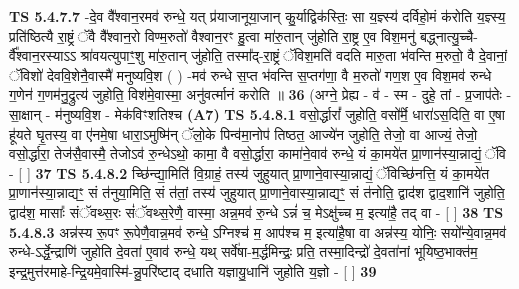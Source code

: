 \documentclass[17pt]{extarticle}
\begin{document}
                  \newline
                                \textbf{ TS 5.4.7.7} \newline
                  -दे॒व वै᳚श्वान॒रमव॑ रुन्धे॒ यत् प्र॑याजानूया॒जान् कु॒र्याद्विक॑स्तिः॒ सा य॒ज्ञ्स्य॑ दर्विहो॒मं क॑रोति य॒ज्ञ्स्य॒ प्रति॑ष्ठित्यै रा॒ष्ट्रं ॅवै वै᳚श्वान॒रो विण्म॒रुतो॑ वैश्वान॒रꣳ हु॒त्वा मा॑रु॒तान् जु॑होति रा॒ष्ट्र ए॒व विश॒मनु॑ बद्ध्नात्यु॒च्चै-र्वै᳚श्वान॒रस्याऽऽ श्रा॑वयत्युपाꣳ॒॒शु मा॑रु॒तान् जु॑होति॒ तस्मा᳚द्-रा॒ष्ट्रं ॅविश॒मति॑ वदति मारु॒ता भ॑वन्ति म॒रुतो॒ वै दे॒वानां॒ ॅविशो॑ देववि॒शेनै॒वास्मै॑ मनुष्यवि॒श ( ) -मव॑ रुन्धे स॒प्त भ॑वन्ति स॒प्तग॑णा॒ वै म॒रुतो॑ गण॒श ए॒व विश॒मव॑ रुन्धे ग॒णेन॑ ग॒णम॑नु॒द्रुत्य॑ जुहोति॒ विश॑मे॒वास्मा॒ अनु॑वर्त्मानं करोति ॥ \textbf{  36 } \newline
                  \newline
                      (अग्ने॒ प्रेह्य - व॑ - स्म - दुहे॒ तां - प्र॒जाप॑तेः - सा॒क्षान् - म॑नुष्यवि॒श - मेक॑विꣳशतिश्च  \textbf{(A7)} \newline \newline
                                        \textbf{ TS 5.4.8.1} \newline
                  वसो॒र्द्धारां᳚ जुहोति॒ वसो᳚र्मे॒ धारा॑ऽस॒दिति॒ वा ए॒षा हू॑यते घृ॒तस्य॒ वा ए॑नमे॒षा धारा॒ऽमुष्मि॑न् ॅलो॒के पिन्व॑मा॒नोप॑ तिष्ठत॒ आज्ये॑न जुहोति॒ तेजो॒ वा आज्यं॒ तेजो॒ वसो॒र्द्धारा॒ तेज॑सै॒वास्मै॒ तेजोऽव॑ रु॒न्धेऽथो॒ कामा॒ वै वसो॒र्द्धारा॒ कामा॑ने॒वाव॑ रुन्धे॒ यं का॒मये॑त प्रा॒णान॑स्या॒न्नाद्यं॒ ॅवि - [  ] \textbf{  37} \newline
                  \newline
                                \textbf{ TS 5.4.8.2} \newline
                  च्छि॑न्द्या॒मिति॑ वि॒ग्राहं॒ तस्य॑ जुहुयात् प्रा॒णाने॒वास्या॒न्नाद्यं॒ ॅविच्छि॑नत्ति॒ यं का॒मये॑त प्रा॒णान॑स्या॒न्नाद्यꣳ॒॒ सं त॑नुया॒मिति॒ सं त॑तां॒ तस्य॑ जुहुयात् प्रा॒णाने॒वास्या॒न्नाद्यꣳ॒॒ सं त॑नोति॒ द्वाद॑श द्वाद॒शानि॑ जुहोति॒ द्वाद॑श॒ मासाः᳚ संॅवथ्स॒रः सं॑ॅवथ्स॒रेणै॒ वास्मा॒ अन्न॒मव॑ रु॒न्धे ऽन्नं॑ च॒ मेऽक्षु॑च्च म॒ इत्या॑है॒ तद् वा - [  ] \textbf{  38} \newline
                  \newline
                                \textbf{ TS 5.4.8.3} \newline
                  अन्न॑स्य रू॒पꣳ रू॒पेणै॒वान्न॒मव॑ रुन्धे॒ ऽग्निश्च॑ म॒ आप॑श्च म॒ इत्या॑है॒षा वा अन्न॑स्य॒ योनिः॒ सयो᳚न्ये॒वान्न॒मव॑ रुन्धे-ऽर्द्धे॒न्द्राणि॑ जुहोति दे॒वता॑ ए॒वाव॑ रुन्धे॒ यथ् सर्वे॑षा-म॒र्द्धमिन्द्रः॒ प्रति॒ तस्मा॒दिन्द्रो॑ दे॒वता॑नां भूयिष्ठ॒भाक्त॑म॒ इन्द्र॒मुत्त॑रमाहे-न्द्रि॒यमे॒वास्मि॑-न्नु॒परि॑ष्टाद् दधाति यज्ञायु॒धानि॑ जुहोति य॒ज्ञो - [  ] \textbf{  39} \newline
\end{document}
